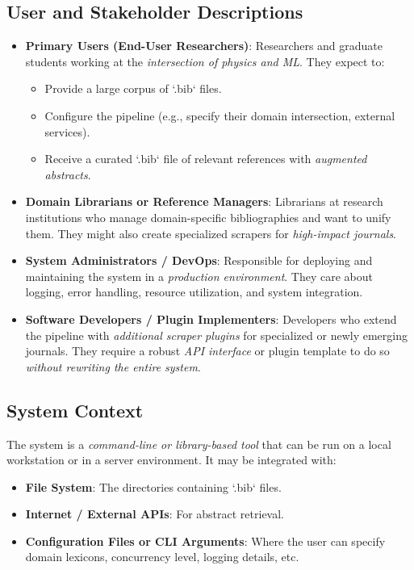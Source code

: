 \documentclass[12pt]{article}
\begin{document}
\subsection{User and Stakeholder Descriptions}
\begin{itemize}
  \item \textbf{Primary Users (End-User Researchers)}: 
  Researchers and graduate students working at the \emph{intersection of physics and ML}. They expect to:
  \begin{itemize}
    \item Provide a large corpus of `.bib` files.
    \item Configure the pipeline (e.g., specify their domain intersection, external services).
    \item Receive a curated `.bib` file of relevant references with \emph{augmented abstracts}.
  \end{itemize}

  \item \textbf{Domain Librarians or Reference Managers}:
  Librarians at research institutions who manage domain-specific bibliographies and want to unify them. They might also create specialized scrapers for \emph{high-impact journals}.

  \item \textbf{System Administrators / DevOps}:
  Responsible for deploying and maintaining the system in a \emph{production environment}. They care about logging, error handling, resource utilization, and system integration.

  \item \textbf{Software Developers / Plugin Implementers}:
  Developers who extend the pipeline with \emph{additional scraper plugins} for specialized or newly emerging journals. They require a robust \emph{API interface} or plugin template to do so \emph{without rewriting the entire system}.

\end{itemize}

\subsection{System Context}
The system is a \emph{command-line or library-based tool} that can be run on a local workstation or in a server environment. It may be integrated with:
\begin{itemize}
  \item \textbf{File System}: The directories containing `.bib` files.
  \item \textbf{Internet / External APIs}: For abstract retrieval. 
  \item \textbf{Configuration Files or CLI Arguments}: Where the user can specify domain lexicons, concurrency level, logging details, etc.
\end{itemize}
\end{document}
